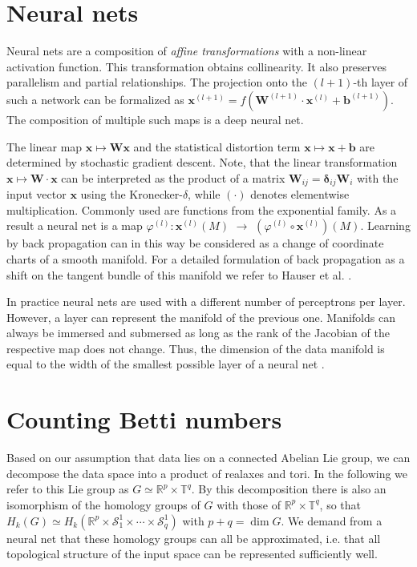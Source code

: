 \documentclass[runningheads,orivec]{llncs}
\begin{document}
\section{Neural nets}
\label{sec:neuralnetworks}
Neural nets are a composition of \emph{affine transformations} with a non-linear activation function. This transformation obtains collinearity. It also preserves parallelism and partial relationships. The projection onto the $(l+1)$-th layer of such a network can be formalized as $\textbf{x}^{(l+1)} = f(\mathbf{W}^{(l+1)} \cdot \textbf{x}^{(l)}+\textbf{b}^{(l+1)}).$ The composition of multiple such maps is a deep neural net.

The linear map $\textbf{x} \mapsto \mathbf{W} \textbf{x}$ and the statistical distortion term $\textbf{x} \mapsto \textbf{x}+\textbf{b}$ are determined by stochastic gradient descent.  Note, that the linear transformation $\textbf{x} \mapsto \mathbf{W} \cdot \textbf{x}$ can be interpreted as the product of a matrix $\mathbf{W}_{ij} = \mathbf{\delta}_{ij}\mathbf{W}_i$ with the input vector $\textbf{x}$ using the Kronecker-$\delta$, while $(\cdot)$ denotes elementwise multiplication. Commonly used are functions from the exponential family. As a result a neural net is a map $\varphi^{(l)}:\textbf{x}^{(l)}(M)$ $\rightarrow$ $(\varphi^{(l)} \circ \textbf{x}^{(l)})(M)$. Learning by back propagation can in this way be considered as a change of coordinate charts of a smooth manifold. For a detailed formulation of back propagation as a shift on the tangent bundle of this manifold we refer to Hauser et al. \cite{HauserR17}.

In practice neural nets are used with a different number of perceptrons per layer. However, a layer can represent the manifold of the previous one. Manifolds can always be immersed and submersed as long as the rank of the Jacobian of the respective map does not change. Thus, the dimension of the data manifold is equal to the width of the smallest possible layer of a neural net \cite{HauserR17}. 

\section{Counting Betti numbers}
Based on our assumption that data lies on a connected Abelian Lie group, we can decompose the data space into a product of realaxes and tori. In the following we refer to this Lie group as $G \simeq \mathbb{R}^p \times \mathbb{T}^q$. By this decomposition there is also an isomorphism of the homology groups of $G$ with those of $\mathbb{R}^p \times \mathbb{T}^q$, so that $H_k(G) \simeq H_k(\mathbb{R}^p \times \mathcal{S}^{1}_{1}\times\cdots\times\mathcal{S}^{1}_{q})$ with $p+q = \dim G$. We demand from a neural net that these homology groups can all be approximated, i.e. that all topological structure of the input space can be represented sufficiently well. 
\end{document}
